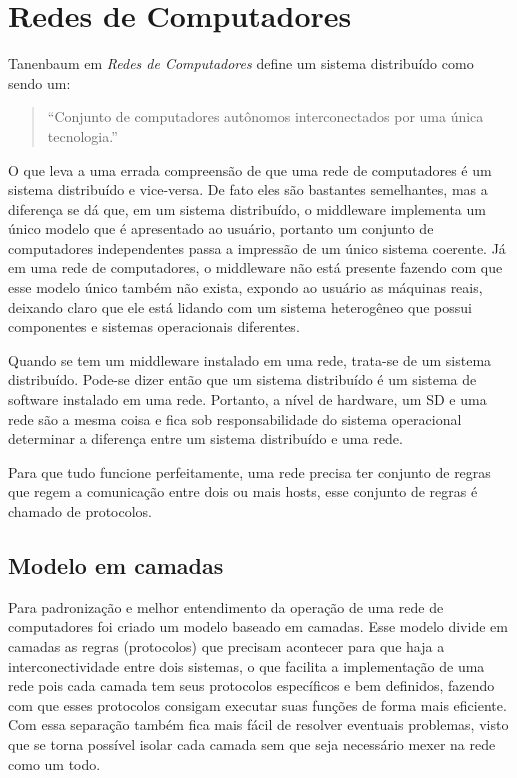 \section{Redes de Computadores}
    Tanenbaum em \textit{Redes de Computadores} define um sistema distribuído como sendo um: %

    \begin{quote}
        ``Conjunto de computadores autônomos interconectados por uma única tecnologia.''
     \end{quote}

    O que leva a uma errada compreensão de que uma rede de computadores é um sistema distribuído e vice-versa. De fato eles são bastantes semelhantes, mas a diferença se dá que, em um sistema distribuído, o middleware implementa um único modelo que é apresentado ao usuário, portanto um conjunto de computadores independentes passa a impressão de um único sistema coerente. Já em uma rede de computadores, o middleware não está presente fazendo com que esse modelo único também não exista, expondo ao usuário as máquinas reais, deixando claro que ele está lidando com um sistema heterogêneo que possui componentes e sistemas operacionais diferentes.

    Quando se tem um middleware instalado em uma rede, trata-se de um sistema distribuído. Pode-se dizer então que um sistema distribuído é um sistema de software instalado em uma rede. Portanto, a nível de hardware, um SD e uma rede são a mesma coisa e fica sob responsabilidade do sistema operacional determinar a diferença entre um sistema distribuído e uma rede.

    Para que tudo funcione perfeitamente, uma rede precisa ter conjunto de regras que regem a comunicação entre dois ou mais hosts, esse conjunto de regras é chamado de protocolos.%

    \subsection{Modelo em camadas}
        Para padronização e melhor entendimento da operação de uma rede de computadores foi criado um modelo baseado em camadas. Esse modelo divide em camadas as regras (protocolos) que precisam acontecer para que haja a interconectividade entre dois sistemas, o que facilita a implementação de uma rede pois cada camada tem seus protocolos específicos e bem definidos, fazendo com que esses protocolos consigam executar suas funções de forma mais eficiente. Com essa separação também fica mais fácil de resolver eventuais problemas, visto que se torna possível isolar cada camada sem que seja necessário mexer na rede como um todo.

